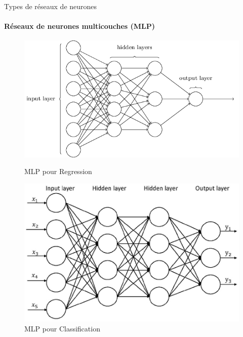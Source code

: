 \documentclass{beamer}
\begin{document}
\begin{frame}{Types de réseaux de neurones}
	\framesubtitle{Réseaux de neurones multicouches (MLP)}
	\begin{figure}[h]
		\centering
		\begin{minipage}{0.5\textwidth}
			\centering
			\includegraphics[width=1.1\linewidth]{mlpr.png}
			\caption{MLP pour Regression}
		\end{minipage}\hfill
		\begin{minipage}{0.5\textwidth}
			\centering
			\includegraphics[width=\linewidth]{mlc.jpeg}
			\caption{MLP pour Classification}
		\end{minipage}
	\end{figure}
\end{frame}
\end{document}
